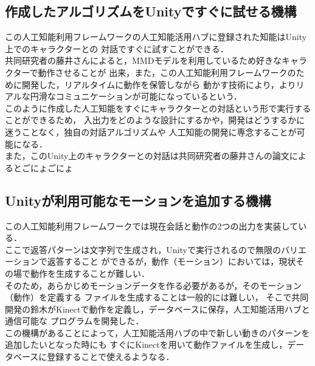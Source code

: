 \subsection{作成したアルゴリズムをUnityですぐに試せる機構}
この人工知能利用フレームワークの人工知能活用ハブに登録された知能はUnity上でのキャラクターとの
対話ですぐに試すことができる．\\

共同研究者の藤井さんによると，MMDモデルを利用しているため好きなキャラクターで動作させることが
出来，また，この人工知能利用フレームワークのために開発した，リアルタイムに動作を保管しながら
動かす技術により，よりリアルな円滑なコミュニケーションが可能になっているという．\\

このように作成した人工知能をすぐにキャラクターとの対話という形で実行することができるため，
入出力をどのような設計にするかや，開発はどうするかに迷うことなく，独自の対話アルゴリズムや
人工知能の開発に専念することが可能になる．\\

また，このUnity上のキャラクターとの対話は共同研究者の藤井さんの論文によるとごにょごにょ

\subsection{Unityが利用可能なモーションを追加する機構}
この人工知能利用フレームワークでは現在会話と動作の2つの出力を実装している．\\

ここで返答パターンは文字列で生成され，Unityで実行されるので無限のバリエーションで返答すること
ができるが，動作（モーション）においては，現状その場で動作を生成することが難しい．\\

そのため，あらかじめモーションデータを作る必要があるが，そのモーション（動作）を定義する
ファイルを生成することは一般的には難しい，
そこで共同開発の鈴木がKinectで動作を定義し，データベースに保存，人工知能活用ハブと通信可能な
プログラムを開発した．\\

この機構があることによって，人工知能活用ハブの中で新しい動きのパターンを追加したいとなった時にも
すぐにKinectを用いて動作ファイルを生成し，データベースに登録することで使えるようなる．

